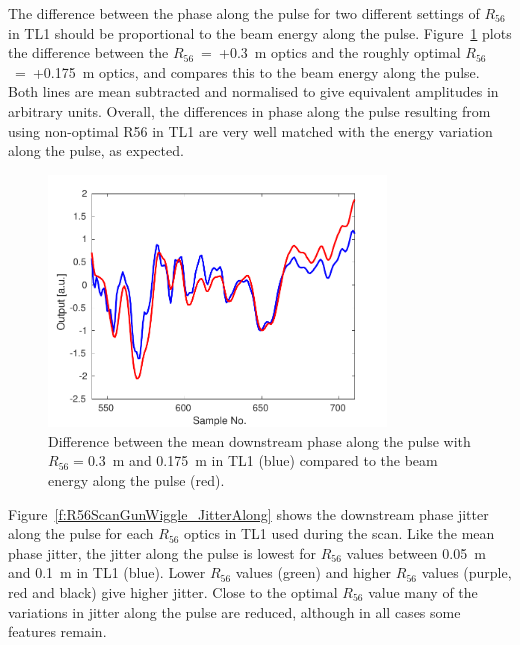 The difference between the phase along the pulse for two different settings of \(R_{56}\) in TL1 should be proportional to the beam energy along the pulse. Figure~\ref{f:r56Scan_comparisonPhaseEnergy} plots the difference between the \(R_{56}\)~=~+0.3~m optics and the roughly optimal \(R_{56}\)~=~+0.175~m optics, and compares this to the beam energy along the pulse. Both lines are mean subtracted and normalised to give equivalent amplitudes in arbitrary units. Overall, the differences in phase along the pulse resulting from using non-optimal R56 in TL1 are very well matched with the energy variation along the pulse, as expected. 

\begin{figure}
  \centering
  \includegraphics[width=0.8\textwidth]{Figures/propagation/r56Scan_comparisonPhaseEnergy}
  \caption{Difference between the mean downstream phase along the pulse with \(R_{56} = 0.3\)~m and 0.175~m in TL1 (blue) compared to the beam energy along the pulse (red).}
  \label{f:r56Scan_comparisonPhaseEnergy}
\end{figure}

Figure~\ref{f:R56ScanGunWiggle_JitterAlong} shows the downstream phase jitter along the pulse for each \(R_{56}\) optics in TL1 used during the scan. Like the mean phase jitter, the jitter along the pulse is lowest for \(R_{56}\) values between 0.05~m and 0.1~m in TL1 (blue). Lower \(R_{56}\) values (green) and higher \(R_{56}\) values (purple, red and black) give higher jitter. Close to the optimal \(R_{56}\) value many of the variations in jitter along the pulse are reduced, although in all cases some features remain.

